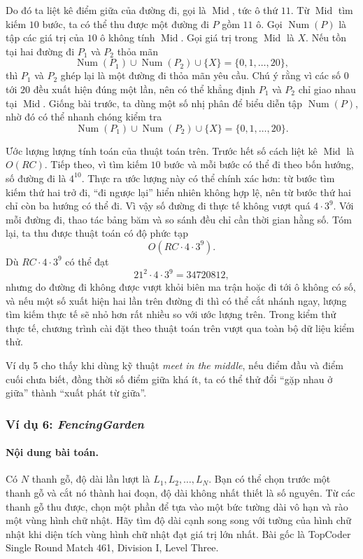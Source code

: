 \documentclass[11pt]{article}
\begin{document}
Do đó ta liệt kê điểm giữa của đường đi, gọi là \(\operatorname{Mid}\), tức ô
thứ \(11\). Từ \(\operatorname{Mid}\) tìm kiếm \(10\) bước, ta có thể thu
được một đường đi \(P\) gồm \(11\) ô. Gọi \(\operatorname{Num}(P)\) là tập các
giá trị của \(10\) ô không tính \(\operatorname{Mid}\). Gọi giá trị trong
\(\operatorname{Mid}\) là \(X\). Nếu tồn tại hai đường đi \(P_1\) và \(P_2\)
thỏa mãn
\[
  \operatorname{Num}(P_1)\cup\operatorname{Num}(P_2)\cup\{X\}
  =
  \{0,1,\ldots,20\},
\]
thì \(P_1\) và \(P_2\) ghép lại là một đường đi thỏa mãn yêu cầu. Chú ý rằng
vì các số \(0\) tới \(20\) đều xuất hiện đúng một lần, nên có thể khẳng định
\(P_1\) và \(P_2\) chỉ giao nhau tại \(\operatorname{Mid}\). Giống bài trước,
ta dùng một số nhị phân để biểu diễn tập \(\operatorname{Num}(P)\), nhờ đó có
thể nhanh chóng kiểm tra
\[
  \operatorname{Num}(P_1)\cup\operatorname{Num}(P_2)\cup\{X\}
  =
  \{0,1,\ldots,20\}.
\]

Ước lượng lượng tính toán của thuật toán trên. Trước hết số cách liệt kê
\(\operatorname{Mid}\) là \(O(RC)\). Tiếp theo, vì tìm kiếm \(10\) bước và
mỗi bước có thể đi theo bốn hướng, số đường đi là \(4^{10}\). Thực ra ước
lượng này có thể chính xác hơn: từ bước tìm kiếm thứ hai trở đi, ``đi ngược
lại'' hiển nhiên không hợp lệ, nên từ bước thứ hai chỉ còn ba hướng có thể
đi. Vì vậy số đường đi thực tế không vượt quá \(4\cdot 3^9\). Với mỗi đường
đi, thao tác bảng băm và so sánh đều chỉ cần thời gian hằng số. Tóm lại, ta
thu được thuật toán có độ phức tạp
\[
  O(RC\cdot 4\cdot 3^9).
\]
Dù \(RC\cdot 4\cdot 3^9\) có thể đạt
\[
  21^2\cdot 4\cdot 3^9=34720812,
\]
nhưng do đường đi không được vượt khỏi biên ma trận hoặc đi tới ô không có
số, và nếu một số xuất hiện hai lần trên đường đi thì có thể cắt nhánh ngay,
lượng tìm kiếm thực tế sẽ nhỏ hơn rất nhiều so với ước lượng trên. Trong kiểm
thử thực tế, chương trình cài đặt theo thuật toán trên vượt qua toàn bộ dữ
liệu kiểm thử.

Ví dụ 5 cho thấy khi dùng kỹ thuật \emph{meet in the middle}, nếu điểm đầu
và điểm cuối chưa biết, đồng thời số điểm giữa khá ít, ta có thể thử đổi
``gặp nhau ở giữa'' thành ``xuất phát từ giữa''.

\subsubsection{Ví dụ 6: \emph{FencingGarden}}

\paragraph{Nội dung bài toán.}
Có \(N\) thanh gỗ, độ dài lần lượt là \(L_1,L_2,\ldots,L_N\). Bạn có thể chọn
trước một thanh gỗ và cắt nó thành hai đoạn, độ dài không nhất thiết là số
nguyên. Từ các thanh gỗ thu được, chọn một phần để tựa vào một bức tường dài
vô hạn và rào một vùng hình chữ nhật. Hãy tìm độ dài cạnh song song với tường
của hình chữ nhật khi diện tích vùng hình chữ nhật đạt giá trị lớn nhất. Bài
gốc là TopCoder Single Round Match 461, Division I, Level Three.
\end{document}
